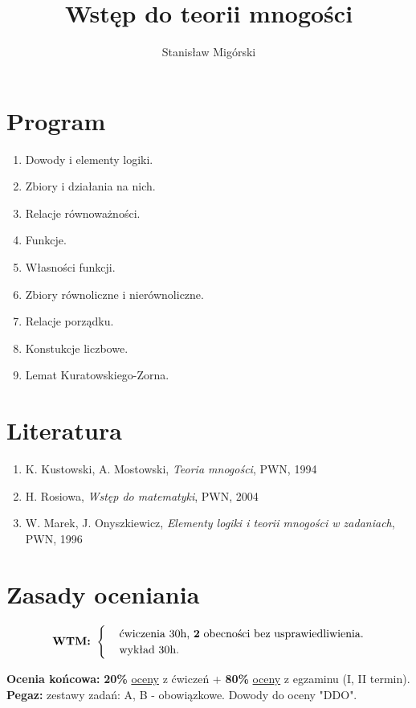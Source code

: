 \documentclass[a5paper,8pt]{article}
\title{Wstęp do teorii mnogości}
\author{Stanisław Migórski}
\date{}
\begin{document}
    \maketitle

    \section{Program} %
    \label{sec:program}
        \begin{enumerate}
            \item Dowody i elementy logiki.
            \item Zbiory i działania na nich.
            \item Relacje równoważności.
            \item Funkcje.
            \item Własności funkcji.
            \item Zbiory równoliczne i nierównoliczne.
            \item Relacje porządku.
            \item Konstukcje liczbowe.
            \item Lemat Kuratowskiego-Zorna.
        \end{enumerate}

    \section{Literatura} %
    \label{sec:literatura}
        \begin{enumerate}
            \item K. Kustowski, A. Mostowski, \textit{Teoria mnogości}, PWN, 1994
            \item H. Rosiowa, \textit{Wstęp do matematyki}, PWN, 2004
            \item W. Marek, J. Onyszkiewicz, \textit{Elementy logiki i teorii mnogości w zadaniach}, PWN, 1996
        \end{enumerate}

    \section{Zasady oceniania} %
    \label{sec:zasady_oceniania}

        \begin{equation*}
          \textbf{WTM:  }\begin{cases}
            & \text{ćwiczenia 30h, \textbf{2} obecności bez usprawiedliwienia}.\\
            & \text{wykład 30h}.
          \end{cases}
        \end{equation*}

        \textbf{Ocenia końcowa: } \textbf{20\%} \underline{oceny} z ćwiczeń + \textbf{80\%} \underline{oceny} z egzaminu (I, II termin).\\

        \textbf{Pegaz: } zestawy zadań: A, B - obowiązkowe. Dowody do oceny "DDO".

\end{document}
